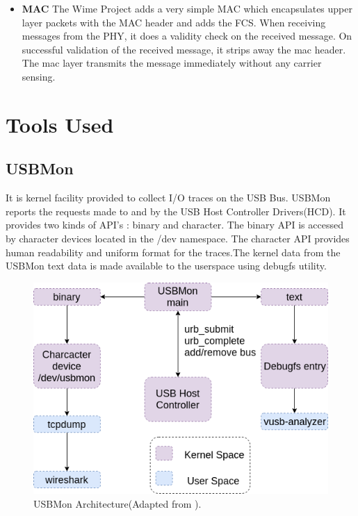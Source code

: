 \begin{itemize}
\item{\textbf{MAC} The Wime Project adds a very simple MAC which encapsulates upper layer packets with the MAC header and adds the \ac{FCS}.
When receiving messages from the \ac{PHY}, it does a validity check on the received message.
On successful validation of the received message, it strips away the \ac{mac} header.
The \ac{mac} layer transmits the message immediately without any carrier sensing.}
\end{itemize}

\section{Tools Used}
\subsection{USBMon}
It is kernel facility provided to collect I/O traces on the USB Bus\cite{_usbmon}. USBMon reports the requests made to and by the USB Host Controller Drivers(HCD). It provides two kinds of API's : binary and character. The binary API is accessed by character devices located in the /dev namespace. The character API provides human readability and uniform format for the traces.The kernel data from the USBMon text data is made available to the userspace using debugfs\cite{_debugfs} utility.

\begin{figure}[h!]
\centering
\includegraphics[width=\textwidth]{Figure/USBMon.png}
\caption{USBMon Architecture(Adapted from \cite{basak_usb_2018}).}
\end{figure}


